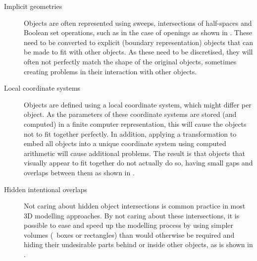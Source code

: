 \begin{description}

\item[Implicit geometries] Objects are often represented using sweeps, intersections of half-spaces and Boolean set operations, such as in the case of openings as shown in .
These need to be converted to explicit (boundary representation) objects that can be made to fit with other objects.
As these need to be discretised, they will often not perfectly match the shape of the original objects, sometimes creating problems in their interaction with other objects.

\item[Local coordinate systems] Objects are defined using a local coordinate system, which might differ per object.
As the parameters of these coordinate systems are stored (and computed) in a finite computer representation, this will cause the objects not to fit together perfectly.
In addition, applying a transformation to embed all objects into a unique coordinate system using computed arithmetic will cause additional problems.
The result is that objects that visually appear to fit together do not actually do so, having small gaps and overlaps between them as shown in .

\item[Hidden intentional overlaps] Not caring about hidden object intersections is common practice in most 3D modelling approaches.
By not caring about these intersections, it is possible to ease and speed up the modelling process by using simpler volumes (\eg\ boxes or rectangles) than would otherwise be required and hiding their undesirable parts behind or inside other objects, as is shown in .

\end{description}

